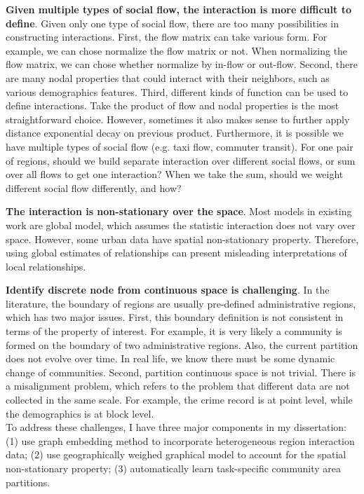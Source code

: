 \textbf{Given multiple types of social flow, the interaction is more difficult to define}. Given only one type of social flow, there are too many possibilities in constructing interactions.  First, the flow matrix can take various form. For example, we can chose normalize the flow matrix or not. When normalizing the flow matrix, we can chose whether normalize by in-flow or out-flow. Second, there are many nodal properties that could interact with their neighbors, such as various demographics features. Third, different kinds of function can be used to define interactions. Take the product of flow and nodal properties is the most straightforward choice. However, sometimes it also makes sense to further apply distance exponential decay on previous product.  Furthermore, it is possible we have multiple types of social flow (e.g. taxi flow, commuter transit). For one pair of regions, should we build separate interaction over different social flows, or sum over all flows to get one interaction? When we take the sum, should we weight different social flow differently, and how?


\textbf{The interaction is non-stationary over the space}. Most models in existing work are global model, which assumes the statistic interaction does not vary over space. However, some urban data have spatial non-stationary property. Therefore, using global estimates of relationships can present misleading interpretations of local relationships.



\textbf{Identify discrete node from continuous space is challenging}. In the literature, the boundary of regions are usually pre-defined administrative regions, which has two major issues. First, this boundary definition is not consistent in terms of the property of interest. For example, it is very likely a community is formed on the boundary of two administrative regions. Also, the current partition does not evolve over time. In real life, we know there must be some dynamic change of communities. Second, partition continuous space is not trivial. There is a misalignment problem, which refers to the problem that different data are not collected in the same scale. For example, the crime record is at point level, while the demographics is at block level. \\



To address these challenges, I have three major components in my dissertation: (1) use graph embedding method to incorporate heterogeneous region interaction data; (2) use geographically weighed graphical model to account for the spatial non-stationary property; (3) automatically learn task-specific community area partitions.



